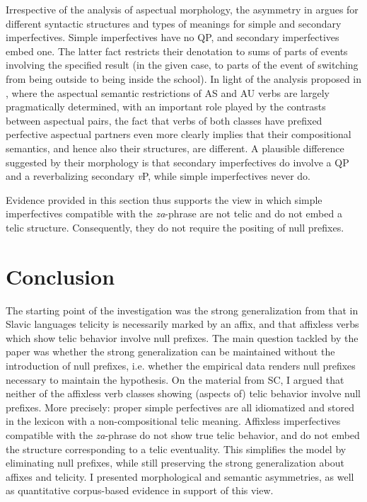 \documentclass[output=paper]{langscibook}
\begin{document}
Irrespective of the analysis of aspectual morphology, the asymmetry in  argues for different syntactic structures and types of meanings for simple and secondary imperfectives. Simple imperfectives have no QP, and secondary imperfectives embed one. The latter fact restricts their denotation to sums of parts of events involving the specified result (in the given case, to parts of the event of switching from being outside to being inside the school). In light of the analysis proposed in , where the aspectual semantic restrictions of AS and AU verbs are largely pragmatically determined, with an important role played by the contrasts between aspectual pairs, the fact that verbs of both classes have prefixed perfective aspectual partners even more clearly implies that their compositional semantics, and hence also their structures, are different. A plausible difference suggested by their morphology is that secondary imperfectives do involve a QP and a reverbalizing secondary \textit{v}P, while simple imperfectives never do.

Evidence provided in this section thus supports the view in which simple imperfectives compatible with the \textit{za}-phrase are not telic and do not embed a telic structure. Consequently, they do not require the positing of null prefixes.

\section{Conclusion}\label{ars:sec:conc}
The starting point of the investigation was the strong generalization from \citet{Lazor.2010} that in Slavic languages telicity is necessarily marked by an affix, and that affixless verbs which show telic behavior involve null prefixes. The main question tackled by the paper was whether the strong generalization can be maintained without the introduction of null prefixes, i.e. whether the empirical data renders null prefixes necessary to maintain the hypothesis. On the material from SC, I argued that neither of the affixless verb classes showing (aspects of) telic behavior involve null prefixes. More precisely: proper simple perfectives are all idiomatized and stored in the lexicon with a non-compositional telic meaning. Affixless imperfectives compatible with the \textit{za}-phrase do not show true telic behavior, and do not embed the structure corresponding to a telic eventuality. This simplifies the model by eliminating null prefixes, while still preserving the strong generalization about affixes and telicity. I presented morphological and semantic asymmetries, as well as quantitative corpus-based evidence in support of this view.
\end{document}
